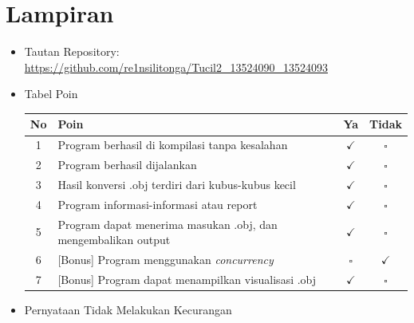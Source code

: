 \documentclass{article}
\begin{document}
\section{Lampiran}
\begin{itemize}
    \item Tautan Repository:\\
    \url{https://github.com/re1nsilitonga/Tucil2_13524090_13524093}
    \item Tabel Poin
    \begin{center}
    \renewcommand{\arraystretch}{1.5}
    \begin{tabular}{|c|p{9cm}|c|c|}
    \hline
    \textbf{No} & \textbf{Poin} & \textbf{Ya} & \textbf{Tidak} \\
    \hline

    1 & Program berhasil di kompilasi tanpa kesalahan & $\checkmark$ & $\square$ \\
    \hline

    2 & Program berhasil dijalankan & $\checkmark$ & $\square$ \\
    \hline

    3 & Hasil konversi .obj terdiri dari kubus-kubus kecil & $\checkmark$ & $\square$ \\
    \hline

    4 & Program informasi-informasi atau report & $\checkmark$ & $\square$ \\
    \hline

    5 & Program dapat menerima masukan .obj, dan mengembalikan output & $\checkmark$ & $\square$ \\
    \hline

    6 & [Bonus] Program menggunakan \textit{concurrency} & $\square$ & $\checkmark$ \\
    \hline

    7 & [Bonus] Program dapat menampilkan visualisasi .obj & $\checkmark$ & $\square$ \\
    \hline
    \end{tabular}
    \end{center}
    \item Pernyataan Tidak Melakukan Kecurangan
    \begin{center}
\end{center}
\end{itemize}
\end{document}
